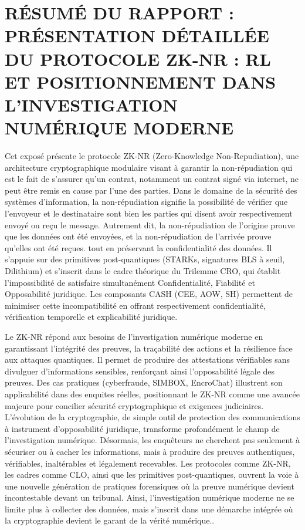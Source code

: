 \documentclass[12pt,a4paper]{article}
\begin{document}
{	\section*{RÉSUMÉ DU RAPPORT : PRÉSENTATION DÉTAILLÉE DU PROTOCOLE ZK-NR : RL ET
		POSITIONNEMENT DANS L’INVESTIGATION NUMÉRIQUE
		MODERNE}	
	 Cet exposé présente le protocole ZK-NR (Zero-Knowledge Non-Repudiation), une architecture cryptographique modulaire visant à garantir la non-répudiation qui est le fait de s’assurer qu’un contrat, notamment un contrat signé via internet, ne peut être remis en cause par l’une des parties. Dans le domaine de la sécurité des systèmes d’information, la non-répudiation signifie la possibilité de vérifier que l’envoyeur et le destinataire sont bien les parties qui disent avoir respectivement envoyé ou reçu le message. Autrement dit, la non-répudiation de l’origine prouve que les données ont été envoyées, et la non-répudiation de l’arrivée prouve qu’elles ont été reçues. tout en préservant la confidentialité des données. Il s’appuie sur des primitives post-quantiques (STARKs, signatures BLS à seuil, Dilithium) et s’inscrit dans le cadre théorique du Trilemme CRO, qui établit l’impossibilité de satisfaire simultanément Confidentialité, Fiabilité et Opposabilité juridique. Les composants CASH (CEE, AOW, SH) permettent de minimiser cette incompatibilité en offrant respectivement confidentialité, vérification temporelle et explicabilité juridique.
		
		Le ZK-NR répond aux besoins de l’investigation numérique moderne en garantissant l’intégrité des preuves, la traçabilité des actions et la résilience face aux attaques quantiques. Il permet de produire des attestations vérifiables sans divulguer d’informations sensibles, renforçant ainsi l’opposabilité légale des preuves. Des cas pratiques (cyberfraude, SIMBOX, EncroChat) illustrent son applicabilité dans des enquites réelles, positionnant le ZK-NR comme une avancée majeure pour concilier sécurité cryptographique et exigences judiciaires.
		L’évolution de la cryptographie, de simple outil de protection des communications à instrument	d’opposabilité juridique, transforme profondément le champ de l’investigation numérique.
		Désormais, les enquêteurs ne cherchent pas seulement à sécuriser ou à cacher les informations, mais à produire des preuves authentiques, vérifiables, inaltérables et légalement recevables. Les
		protocoles comme ZK-NR, les cadres comme CLO, ainsi que les primitives post-quantiques, ouvrent la voie à une nouvelle génération de pratiques forensiques où la preuve numérique devient incontestable
		devant un tribunal. Ainsi, l’investigation numérique moderne ne se limite plus à collecter des données, mais s’inscrit dans une démarche intégrée où la cryptographie devient le garant de la vérité numérique..\\[2 cm]
		
}
\end{document}
